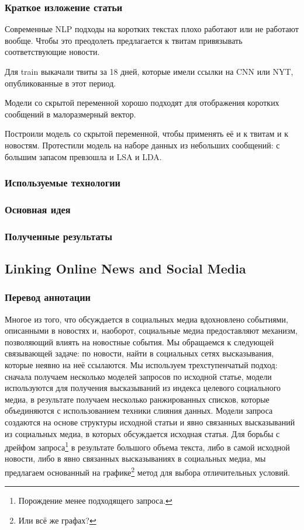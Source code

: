 \documentclass[12pt,a4paper,oneside]{extarticle}
\begin{document}
        \subsubsection{Краткое изложение статьи}
        Современные NLP подходы на коротких текстах плохо работают или не работают вообще.
        Чтобы это преодолеть предлагается к твитам привязывать соответствующие новости.

        Для train выкачали твиты за 18 дней, которые имели ссылки на CNN или NYT, опубликованные в этот период.

        Модели со скрытой переменной хорошо подходят для отображения коротких сообщений в малоразмерный вектор.

        Построили модель со скрытой переменной, чтобы применять её и к твитам и к новостям. Протестили модель на наборе данных из небольших сообщений: с большим запасом превзошла и LSA и LDA.


        \subsubsection{Используемые технологии}

        \subsubsection{Основная идея}
        

        \subsubsection{Полученные результаты}

    \subsection{Linking Online News and Social Media}
        \subsubsection{Перевод аннотации}
            Многое из того, что обсуждается в социальных медиа вдохновлено событиями, описанными в новостях и, наоборот, социальные медиа предоставляют механизм, позволяющий влиять на новостные события.
            Мы обращаемся к следующей связывающей задаче: по новости, найти в социальных сетях высказывания, которые неявно на неё ссылаются.
            Мы используем трехступенчатый подход: сначала получаем несколько моделей запросов по исходной статье, модели используются для получения высказываний из индекса целевого социального медиа, в результате получаем несколько ранжированных списков, которые объединяются с использованием техники слияния данных.
            Модели запроса создаются на основе структуры исходной статьи и явно связанных высказываний из социальных медиа, в которых обсуждается исходная статья.
            Для борьбы с дрейфом запроса\footnote{Порождение менее подходящего запроса.} в результате большого объема текста, либо в самой исходной новости, либо в явно связанных высказываниях в социальных медиа, мы предлагаем основанный на графике\footnote{Или всё же графах?} метод для выбора отличительных условий.
\end{document}

